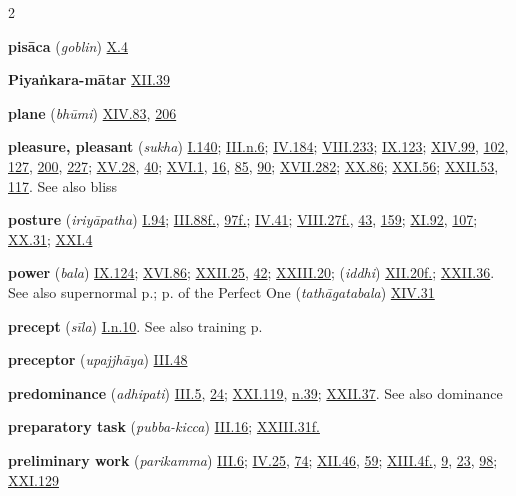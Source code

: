 \begin{multicols}{2}
\begin{vismHanging}
\par\textbf{pisāca} (\emph{goblin}) \hyperlink{X.4}{X.4}{}
\par\textbf{Piyaṅkara-mātar} \hyperlink{XII.39}{XII.39}{}
\par\textbf{plane} (\emph{bhūmi}) \hyperlink{XIV.83}{XIV.83}{}, \hyperlink{XIV.206}{206}{}
\par\textbf{pleasure, pleasant} (\emph{sukha}) \hyperlink{I.140}{I.140}{}; \hyperlink{III.n6}{III.n.6}{}; \hyperlink{IV.184}{IV.184}{}; \hyperlink{VIII.233}{VIII.233}{}; \hyperlink{IX.123}{IX.123}{}; \hyperlink{XIV.99}{XIV.99}{}, \hyperlink{XIV.102}{102}{}, \hyperlink{XIV.127}{127}{}, \hyperlink{XIV.200}{200}{}, \hyperlink{XIV.227}{227}{}; \hyperlink{XV.28}{XV.28}{}, \hyperlink{XV.40}{40}{}; \hyperlink{XVI.1}{XVI.1}{}, \hyperlink{XVI.16}{16}{}, \hyperlink{XVI.85}{85}{}, \hyperlink{XVI.90}{90}{}; \hyperlink{XVII.282}{XVII.282}{}; \hyperlink{XX.86}{XX.86}{}; \hyperlink{XXI.56}{XXI.56}{}; \hyperlink{XXII.53}{XXII.53}{}, \hyperlink{XXII.117}{117}{}. See also bliss 
\par\textbf{posture} (\emph{iriyāpatha}) \hyperlink{I.94}{I.94}{}; \hyperlink{III.88}{III.88f.}{}, \hyperlink{III.97}{97f.}{}; \hyperlink{IV.41}{IV.41}{}; \hyperlink{VIII.27}{VIII.27f.}{}, \hyperlink{VIII.43}{43}{}, \hyperlink{VIII.159}{159}{}; \hyperlink{XI.92}{XI.92}{}, \hyperlink{XI.107}{107}{}; \hyperlink{XX.31}{XX.31}{}; \hyperlink{XXI.4}{XXI.4}{}
\par\textbf{power} (\emph{bala}) \hyperlink{IX.124}{IX.124}{}; \hyperlink{XVI.86}{XVI.86}{}; \hyperlink{XXII.25}{XXII.25}{}, \hyperlink{XXII.42}{42}{}; \hyperlink{XXIII.20}{XXIII.20}{}; (\emph{iddhi}) \hyperlink{XII.20}{XII.20f.}{}; \hyperlink{XXII.36}{XXII.36}{}. See also supernormal p.; p. of the Perfect One (\emph{tathāgatabala}) \hyperlink{XIV.31}{XIV.31}{}
\par\textbf{precept} (\emph{sīla}) \hyperlink{I.n10}{I.n.10}{}. See also training p.
\par\textbf{preceptor} (\emph{upajjhāya}) \hyperlink{III.48}{III.48}{}
\par\textbf{predominance} (\emph{adhipati}) \hyperlink{III.5}{III.5}{}, \hyperlink{III.24}{24}{}; \hyperlink{XXI.119}{XXI.119}{}, \hyperlink{XXI.n39}{n.39}{}; \hyperlink{XXII.37}{XXII.37}{}. See also dominance 
\par\textbf{preparatory task} (\emph{pubba-kicca}) \hyperlink{III.16}{III.16}{}; \hyperlink{XXIII.31}{XXIII.31f.}{}
\par\textbf{preliminary work} (\emph{parikamma}) \hyperlink{III.6}{III.6}{}; \hyperlink{IV.25}{IV.25}{}, \hyperlink{IV.74}{74}{}; \hyperlink{XII.46}{XII.46}{}, \hyperlink{XII.59}{59}{}; \hyperlink{XIII.4}{XIII.4f.}{}, \hyperlink{XIII.9}{9}{}, \hyperlink{XIII.23}{23}{}, \hyperlink{XIII.98}{98}{}; \hyperlink{XXI.129}{XXI.129}{}

\end{vismHanging}
\end{multicols}
